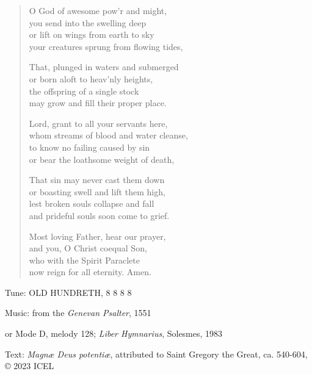 \hymn

\begin{verse}
O God of awesome pow’r and might,\\
you send into the swelling deep\\
or lift on wings from earth to sky\\
your creatures sprung from flowing tides,

That, plunged in waters and submerged\\
or born aloft to heav’nly heights,\\
the offspring of a single stock\\
may grow and fill their proper place.

Lord, grant to all your servants here,\\
whom streams of blood and water cleanse,\\
to know no failing caused by sin\\
or bear the loathsome weight of death,

That sin may never cast them down\\
or boasting swell and lift them high,\\
lest broken souls collapse and fall\\
and prideful souls soon come to grief.

Most loving Father, hear our prayer,\\
and you, O Christ coequal Son,\\
who with the Spirit Paraclete\\
now reign for all eternity. Amen.
\end{verse}

\begin{hymnsource}
Tune: OLD HUNDRETH, 8 8 8 8

Music: from the \emph{Genevan Psalter}, 1551

or Mode D, melody 128; \emph{Liber Hymnarius}, Solesmes, 1983

Text: \emph{Magnæ Deus potentiæ}, attributed to Saint Gregory the Great, ca. 540-604, © 2023 ICEL
\end{hymnsource}